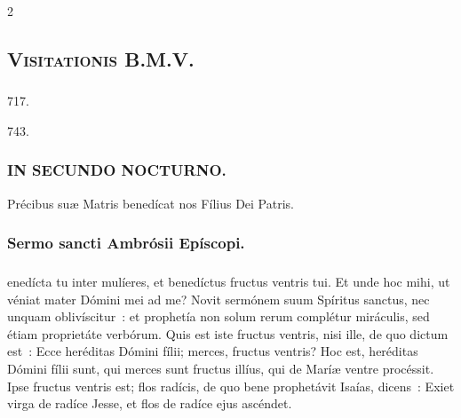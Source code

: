 \documentclass[9pt,twoside]{extarticle}
\begin{document}
\begin{multicols}{2}
\subsection*{\center \textsc{Visitationis B.M.V.}}
\subsubsection*{\center {}}

\begin{tightlist}{}
\item {}
\item {} 717.
\item {} 743.
\item {}
\item {}
\end{tightlist}

\subsubsection*{\center \textsc{IN SECUNDO NOCTURNO.}}
\begin{tightlist}{}
\item {} Précibus suæ Matris benedícat nos Fílius Dei Patris.
\end{tightlist}

\subsubsection*{\center Sermo sancti Ambrósii Epíscopi.}
\subsubsection*{\center {}}
enedícta tu inter mulíeres, et benedíctus fructus ventris tui. Et unde hoc mihi, ut véniat mater Dómini mei ad me? Novit sermónem suum Spíritus sanctus, nec unquam oblivíscitur~: et prophetía non solum rerum complétur miráculis, sed étiam proprietáte verbórum. Quis est iste fructus ventris, nisi ille, de quo dictum est~: Ecce heréditas Dómini fílii; merces, fructus ventris? Hoc est, heréditas Dómini fílii sunt, qui merces sunt fructus illíus, qui de Maríæ ventre procéssit. Ipse fructus ventris est; flos radícis, de quo bene prophetávit Isaías, dicens~: Exiet virga de radíce Jesse, et flos de radíce ejus ascéndet.


\end{multicols}
\end{document}
